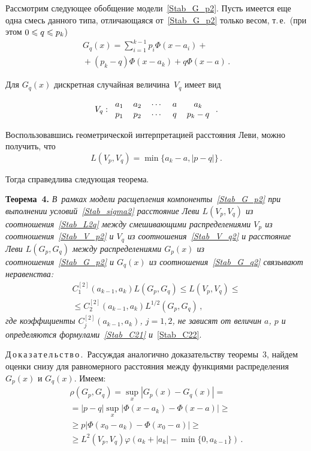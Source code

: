 \begin{multicols}{2}
\medskip

Рассмотрим следующее обобщение модели~\eqref{Stab_G_p2}. Пусть
имеется еще одна смесь данного типа, отличающаяся
от~\eqref{Stab_G_p2} только весом, т.\,е.\ (при этом $0\hm\leqslant q\hm\leqslant p_k$)
\begin{multline}
\label{Stab_G_q2}
G_q(x)=\sum\limits_{i=1}^{k-1}
p_i\Phi(x-a_i)+{}\\
{}+(p_k-q)\Phi(x-a_k)+q\Phi(x-a)\,.
\end{multline}

Для $G_q(x)$ дискретная случайная величина~$V_q$ имеет вид

\noindent
\begin{equation}
\label{Stab_V_q2} 
V_q:
\begin{tabular}{ccccc}
$a_1$&$a_2$&$\cdots$&$a$&$a_k$\\
$p_1$&$p_2$&$\cdots$&$q$&$p_k-q$
\end{tabular}\,.
\end{equation}

Воспользовавшись геометрической интерпретацией расстояния Леви,
можно получить, что
\begin{equation}
\label{Stab_L2q} 
L(V_p,V_q)=\min\{a_k-a,|p-q|\}\,.
\end{equation}

Тогда справедлива следующая теорема.

\medskip

\noindent
\textbf{Теорема~4.}
\textit{В~рамках модели расщепления
компоненты~\eqref{Stab_G_p2} при выполнении
условий~\eqref{Stab_sigma2} расстояние Леви
$L(V_p,V_q)$ из соотношения~\eqref{Stab_L2q} между смешивающими
распределениями $V_p$ из соотношения~\eqref{Stab_V_p2} и $V_q$ из
соотношения~\eqref{Stab_V_q2} и расстояние Леви $L(G_p,G_q)$
между распределениями $G_p(x)$ из соотношения~\eqref{Stab_G_p2} и
$G_q(x)$ из соотношения~\eqref{Stab_G_q2} связывают неравенства:}
\begin{multline*}
C_1^{[2]}(a_{k-1},a_k)L(G_p,G_q)\leqslant
L(V_p,V_q)\leqslant{}\\
{}\leqslant
 C_2^{[2]}(a_{k-1},a_k)L^{1/2}(G_p,G_q)\,,
\end{multline*}
\textit{где коэффициенты $C_j^{[2]}(a_{k-1},a_k)$, $j=1,2$, не зависят от
величин $a$, $p$ и определяются формулами~\eqref{Stab_C21}
и}~\eqref{Stab_C22}.


\medskip

\noindent
Д\,о\,к\,а\,з\,а\,т\,е\,л\,ь\,с\,т\,в\,о\,.\ 
Рассуждая аналогично доказательству теоремы~3,
найдем оценки снизу для равномерного расстояния между функциями
распределения $G_p(x)$ и $G_q(x)$. Имеем:
\begin{multline*}
\rho(G_p,G_q)=\sup\limits_x|G_p(x)-G_q(x)|={}\\
{}=|p-q|\sup\limits_x|\Phi(x-a_k)-\Phi(x-a)|\geqslant{}\\
{}\geqslant
p|\Phi(x_0-a_k)-\Phi(x_0-a)|\geqslant{}\\
{}\geqslant L^2(V_p,V_q)\varphi\left(a_k+|a_k|-\min\{0,a_{k-1}\}\right)\,.
\end{multline*}


\end{multicols}

